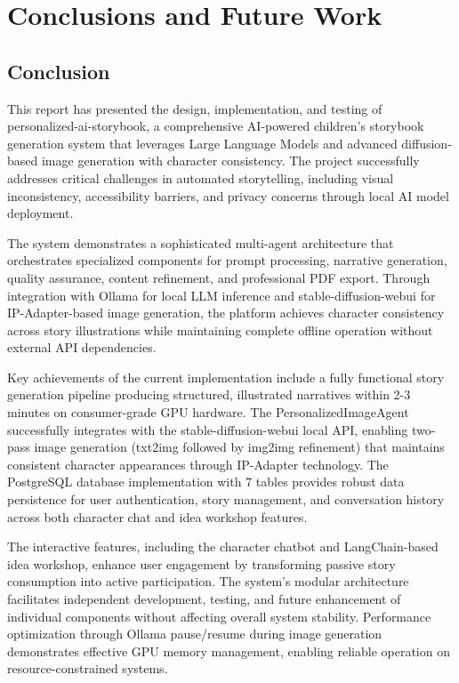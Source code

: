 \chapter{Conclusions and Future Work}

\section{Conclusion}

This report has presented the design, implementation, and testing of personalized-ai-storybook, a comprehensive AI-powered children's storybook generation system that leverages Large Language Models and advanced diffusion-based image generation with character consistency. The project successfully addresses critical challenges in automated storytelling, including visual inconsistency, accessibility barriers, and privacy concerns through local AI model deployment.

The system demonstrates a sophisticated multi-agent architecture that orchestrates specialized components for prompt processing, narrative generation, quality assurance, content refinement, and professional PDF export. Through integration with Ollama for local LLM inference and stable-diffusion-webui for IP-Adapter-based image generation, the platform achieves character consistency across story illustrations while maintaining complete offline operation without external API dependencies.

Key achievements of the current implementation include a fully functional story generation pipeline producing structured, illustrated narratives within 2-3 minutes on consumer-grade GPU hardware. The PersonalizedImageAgent successfully integrates with the stable-diffusion-webui local API, enabling two-pass image generation (txt2img followed by img2img refinement) that maintains consistent character appearances through IP-Adapter technology. The PostgreSQL database implementation with 7 tables provides robust data persistence for user authentication, story management, and conversation history across both character chat and idea workshop features.

The interactive features, including the character chatbot and LangChain-based idea workshop, enhance user engagement by transforming passive story consumption into active participation. The system's modular architecture facilitates independent development, testing, and future enhancement of individual components without affecting overall system stability. Performance optimization through Ollama pause/resume during image generation demonstrates effective GPU memory management, enabling reliable operation on resource-constrained systems.


